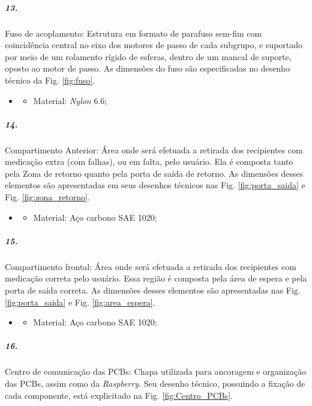 \subparagraph*{13.}\label{retorno_fuso}
Fuso de acoplamento: Estrutura em formato de parafuso sem-fim com coincidência central no eixo dos motores de passo de cada subgrupo, e suportado por meio de um rolamento rígido de esferas, dentro de um mancal de suporte, oposto ao motor de passo. As dimensões do fuso são especificadas no desenho técnico da Fig. \ref{fig:fuso}.

\begin{itemize}
   \item[]
   \begin{itemize}
       \item Material: \textit{Nylon} 6.6;
   \end{itemize}
   \end{itemize}
 

\subparagraph*{14.} \label{retorno_porta}
Compartimento Anterior: Área onde será efetuada a retirada dos recipientes com medicação extra (com falhas), ou em falta, pelo usuário. Ela é composta tanto pela Zona de retorno quanto pela porta de saída de retorno. As dimensões desses elementos são apresentadas em seus desenhos técnicos nas Fig. \ref{fig:porta_saida} e Fig. \ref{fig:zona_retorno}.

 \begin{itemize}
   \item[]
   \begin{itemize}
       \item Material: Aço carbono SAE 1020;
   \end{itemize}
   \end{itemize}

\subparagraph*{15.}
Compartimento frontal: Área onde será efetuada a retirada dos recipientes com medicação correta pelo usuário. Essa região é composta pela área de espera e pela porta de saída correta. As dimensões desses elementos são apresentadas nas Fig. \ref{fig:porta_saida} e Fig. \ref{fig:area_espera}.

 \begin{itemize}
   \item[]
   \begin{itemize}
       \item Material: Aço carbono SAE 1020;
   \end{itemize}
   \end{itemize}
   
 \subparagraph*{16.} \label{retorno_Centro_PCBs}
 Centro de comunicação das PCBs: Chapa utilizada para ancoragem e organização das PCBs, assim como da \textit{Raspberry}. Seu desenho técnico, possuindo a fixação de cada componente, está explicitado na Fig. \ref{fig:Centro_PCBs}.

